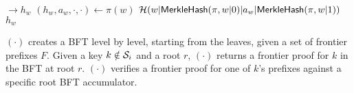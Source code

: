 \begin{algorithm}[H]
\begin{algorithmic}[1]
    \EndFunction
     $\rightarrow h_w$ 
    \label{a:aas:merklehash}
        \State $(h_w, a_w, \cdot,\cdot) \gets \pi(w)$
            \State \Return $\mathcal{H}(w|\mathsf{MerkleHash}(\pi, w|0)|a_w|\mathsf{MerkleHash}(\pi, w|1))$
        \Else
            \State \Return $h_w$
        \EndIf
    \EndFunction
    \end{algorithmic}
\end{algorithm}

{\createfrontier}$(\cdot)$ creates a BFT level by level, starting from the leaves, given a set of frontier prefixes $F$.
Given a key $k\notin \mathcal{S}_i$ and a root $r$, {\provefrontier}$(\cdot)$ returns a frontier proof for $k$ in the BFT at root $r$.
{\verfrontier}$(\cdot)$ verifies a frontier proof for one of $k$'s prefixes against a specific root BFT accumulator.
